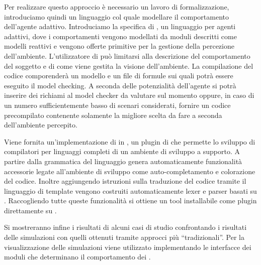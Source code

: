 Per realizzare questo approccio è necessario un lavoro di formalizzazione, introduciamo quindi un linguaggio col quale modellare il comportamento dell'agente adattivo. Introduciamo la specifica di \seal{}, un linguaggio per agenti adattivi, dove i comportamenti vengono modellati da moduli descritti come modelli reattivi e vengono offerte primitive per la gestione della percezione dell'ambiente. L'utilizzatore di \seal{} può limitarsi alla descrizione del comportamento del soggetto e di come viene gestita la visione dell'ambiente. La compilazione del codice \seal{} comporenderà un modello \prism{} e un file di formule \pctl{} sui quali potrà essere eseguito il model checking. A seconda delle potenzialità dell'agente si potrà inserire dei richiami al model checker da valutare sul momento oppure, in caso di un numero sufficientemente basso di scenari considerati, fornire un codice precompilato contenente solamente la migliore scelta da fare a seconda dell'ambiente percepito.

Viene fornita un'implementazione di \seal{} in \xtext{}, %
un plugin di \eclipse{} che permette lo sviluppo di compilatori per linguaggi completi di un ambiente di sviluppo a supporto. A partire dalla grammatica del linguaggio \xtext{} genera automaticamente funzionalità accessorie legate all'ambiente di sviluppo come auto-completamento e colorazione del codice. Inoltre aggiungendo istruzioni sulla traduzione del codice tramite il linguaggio di template \xtend{} %
vengono costruiti automaticamente lexer e parser basati su \antlr{}. %
Raccogliendo tutte queste funzionalità si ottiene un tool installabile come plugin direttamente su \eclipse{}.

Si mostreranno infine i risultati di alcuni casi di studio confrontando i risultati delle simulazioni con quelli ottenuti tramite approcci più ``tradizionali''. Per la visualizzazione delle simulazioni viene utilizzato \argos{} %
implementando le interfacce dei moduli \cpp{} che determinano il comportamento dei \marxbot{}.


